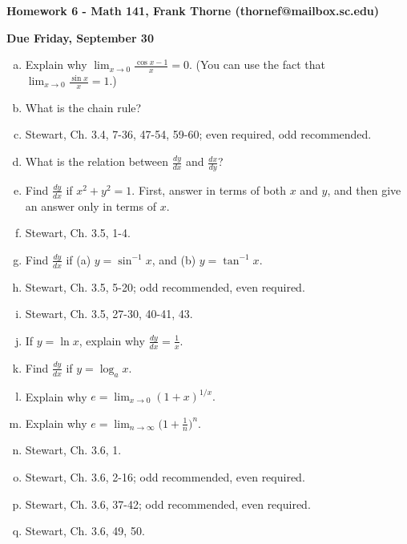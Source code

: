 \documentclass[12pt]{article}
\begin{document}
\setlength{\topmargin}{-2mm}





\begin{center}{\bf Homework 6 - Math 141, Frank Thorne (thornef@mailbox.sc.edu)}
\end{center}
\begin{center}
{\bf Due Friday, September 30}
\end{center}

\begin{enumerate}[(a)]
\item
Explain why $\lim_{x \rightarrow 0} \frac{\cos x - 1}{x} = 0$. (You can use the fact
that $\lim_{x \rightarrow 0} \frac{\sin x}{x} = 1$.)

\item
What is the chain rule?

\item
Stewart, Ch. 3.4, 7-36, 47-54, 59-60; even required, odd recommended.

\item
What is the relation between $\frac{dy}{dx}$ and $\frac{dx}{dy}$? 

\item
Find $\frac{dy}{dx}$ if $x^2 + y^2 = 1$. First, answer in terms of both $x$
and $y$, and then give an answer only in terms of $x$.

\item
Stewart, Ch. 3.5, 1-4.

\item
Find $\frac{dy}{dx}$ if (a) $y = \sin^{-1} x$, and (b) $y = \tan^{-1} x$.

\item
Stewart, Ch. 3.5, 5-20; odd recommended, even required.

\item
Stewart, Ch. 3.5, 27-30, 40-41, 43.

\item
If $y = \ln x$, explain why $\frac{dy}{dx} = \frac{1}{x}$.

\item
Find $\frac{dy}{dx}$ if $y = \log_a x$.

\item
Explain why $e = \lim_{x \rightarrow 0} (1 + x)^{1/x}.$

\item
Explain why $e = \lim_{n \rightarrow \infty} \bigg(1 + \frac{1}{n} \bigg)^n.$

\item
Stewart, Ch. 3.6, 1.

\item
Stewart, Ch. 3.6, 2-16; odd recommended, even required.

\item
Stewart, Ch. 3.6, 37-42; odd recommended, even required.

\item
Stewart, Ch. 3.6, 49, 50.

\end{enumerate}
\end{document}
